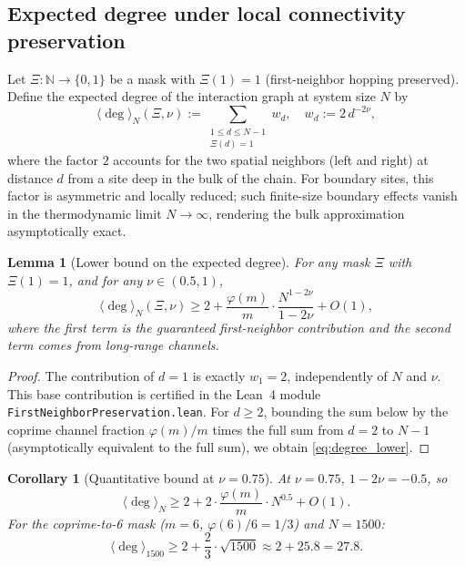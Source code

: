 \documentclass[11pt,a4paper]{article}
\newtheorem{lemma}[theorem]{Lemma}
\newtheorem{corollary}[theorem]{Corollary}
\newcommand{\N}{\mathbb{N}}
\begin{document}
\subsection{Expected degree under local connectivity preservation}
\label{subsec:expected_degree}

Let $\Xi : \N \to \{0, 1\}$ be a mask with $\Xi(1) = 1$ (first-neighbor hopping preserved). Define the expected degree of the interaction graph at system size $N$ by
\begin{equation}
\langle \deg \rangle_N(\Xi, \nu) := \sum_{\substack{1 \le d \le N-1 \\ \Xi(d) = 1}} w_d, \quad w_d := 2 \, d^{-2\nu},
\label{eq:expected_degree_def}
\end{equation}
where the factor $2$ accounts for the two spatial neighbors (left and right) at distance $d$ from a site deep in the bulk of the chain. For boundary sites, this factor is asymmetric and locally reduced; such finite-size boundary effects vanish in the thermodynamic limit $N \to \infty$, rendering the bulk approximation asymptotically exact.

\begin{lemma}[Lower bound on the expected degree]
\label{lem:degree_lower_bound}
For any mask $\Xi$ with $\Xi(1) = 1$, and for any $\nu \in (0.5, 1)$,
\begin{equation}
\langle \deg \rangle_N(\Xi, \nu) \geq 2 + \frac{\varphi(m)}{m} \cdot \frac{N^{1-2\nu}}{1 - 2\nu} + O(1),
\label{eq:degree_lower}
\end{equation}
where the first term is the guaranteed first-neighbor contribution and the second term comes from long-range channels.
\end{lemma}

\begin{proof}
The contribution of $d = 1$ is exactly $w_1 = 2$, independently of $N$ and $\nu$. This base contribution is certified in the Lean~4 module \texttt{FirstNeighborPreservation.lean}. For $d \geq 2$, bounding the sum below by the coprime channel fraction $\varphi(m)/m$ times the full sum from $d = 2$ to $N-1$ (asymptotically equivalent to the full sum), we obtain \cref{eq:degree_lower}.
\end{proof}

\begin{corollary}[Quantitative bound at $\nu = 0.75$]
\label{cor:degree_nu075}
At $\nu = 0.75$, $1 - 2\nu = -0.5$, so
\begin{equation}
\langle \deg \rangle_N \geq 2 + 2 \cdot \frac{\varphi(m)}{m} \cdot N^{0.5} + O(1).
\label{eq:degree_at_075}
\end{equation}
For the coprime-to-6 mask ($m = 6$, $\varphi(6)/6 = 1/3$) and $N = 1500$:
\begin{equation}
\langle \deg \rangle_{1500} \geq 2 + \frac{2}{3} \cdot \sqrt{1500} \approx 2 + 25.8 = 27.8.
\end{equation}
\end{corollary}
\end{document}

